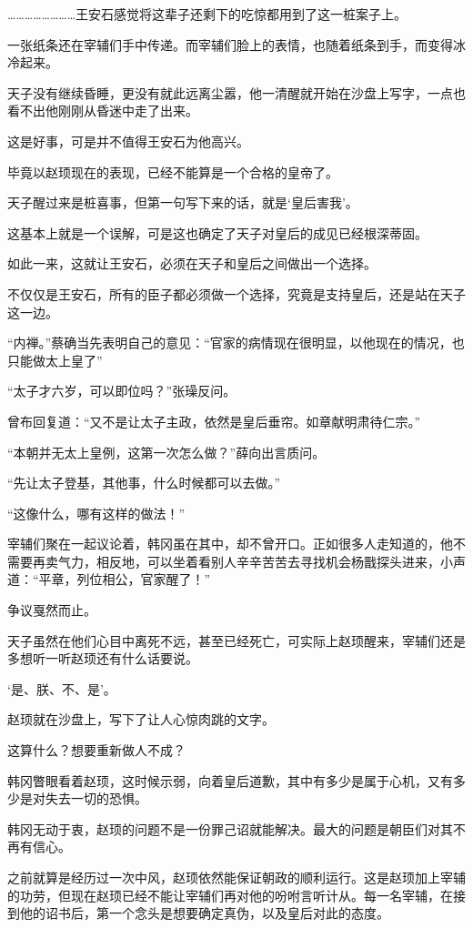 ……………………王安石感觉将这辈子还剩下的吃惊都用到了这一桩案子上。

一张纸条还在宰辅们手中传递。而宰辅们脸上的表情，也随着纸条到手，而变得冰冷起来。

天子没有继续昏睡，更没有就此远离尘嚣，他一清醒就开始在沙盘上写字，一点也看不出他刚刚从昏迷中走了出来。

这是好事，可是并不值得王安石为他高兴。

毕竟以赵顼现在的表现，已经不能算是一个合格的皇帝了。

天子醒过来是桩喜事，但第一句写下来的话，就是‘皇后害我’。

这基本上就是一个误解，可是这也确定了天子对皇后的成见已经根深蒂固。

如此一来，这就让王安石，必须在天子和皇后之间做出一个选择。

不仅仅是王安石，所有的臣子都必须做一个选择，究竟是支持皇后，还是站在天子这一边。

“内禅。”蔡确当先表明自己的意见：“官家的病情现在很明显，以他现在的情况，也只能做太上皇了”

“太子才六岁，可以即位吗？”张璪反问。

曾布回复道：“又不是让太子主政，依然是皇后垂帘。如章献明肃待仁宗。”

“本朝并无太上皇例，这第一次怎么做？”薛向出言质问。

“先让太子登基，其他事，什么时候都可以去做。”

“这像什么，哪有这样的做法！”

宰辅们聚在一起议论着，韩冈虽在其中，却不曾开口。正如很多人走知道的，他不需要再卖气力，相反地，可以坐着看别人辛辛苦苦去寻找机会杨戬探头进来，小声道：“平章，列位相公，官家醒了！”

争议戛然而止。

天子虽然在他们心目中离死不远，甚至已经死亡，可实际上赵顼醒来，宰辅们还是多想听一听赵顼还有什么话要说。

‘是、朕、不、是’。

赵顼就在沙盘上，写下了让人心惊肉跳的文字。

这算什么？想要重新做人不成？

韩冈瞥眼看着赵顼，这时候示弱，向着皇后道歉，其中有多少是属于心机，又有多少是对失去一切的恐惧。

韩冈无动于衷，赵顼的问题不是一份罪己诏就能解决。最大的问题是朝臣们对其不再有信心。

之前就算是经历过一次中风，赵顼依然能保证朝政的顺利运行。这是赵顼加上宰辅的功劳，但现在赵顼已经不能让宰辅们再对他的吩咐言听计从。每一名宰辅，在接到他的诏书后，第一个念头是想要确定真伪，以及皇后对此的态度。

